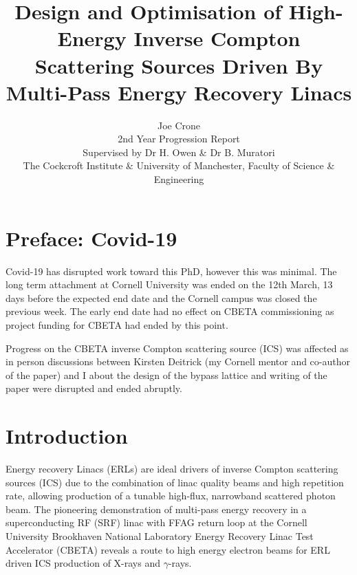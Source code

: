 \documentclass[10pt]{article}
\begin{document}
\title{Design and Optimisation of High-Energy Inverse Compton Scattering Sources Driven By Multi-Pass Energy Recovery Linacs}
\author{
Joe Crone 
\\2nd Year Progression Report 
\\Supervised by Dr H. Owen \& Dr B. Muratori 
\\The Cockcroft Institute \& University of Manchester, Faculty of Science \& Engineering}
\maketitle


\section*{Preface: Covid-19}

Covid-19 has disrupted work toward this PhD, however this was minimal. The long term attachment at Cornell University was ended on the 12th March, 13 days before the expected end date and the Cornell campus was closed the previous week. The early end date had no effect on CBETA commissioning as project funding for CBETA had ended by this point.

Progress on the CBETA inverse Compton scattering source (ICS) was affected as in person discussions between Kirsten Deitrick (my Cornell mentor and co-author of the paper) and I about the design of the bypass lattice and writing of the paper were disrupted and ended abruptly. 

\section*{Introduction}

Energy recovery Linacs (ERLs) are ideal drivers of inverse Compton scattering sources (ICS) due to the combination of linac quality beams and high repetition rate, allowing production of a tunable high-flux, narrowband scattered photon beam. The pioneering demonstration of multi-pass energy recovery in a superconducting RF (SRF) linac with FFAG return loop at the Cornell University Brookhaven National Laboratory Energy Recovery Linac Test Accelerator (CBETA) reveals a route to high energy electron beams for ERL driven ICS production of X-rays and $\gamma$-rays.
\end{document}
